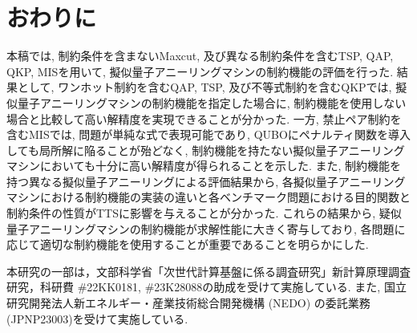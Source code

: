\documentclass[submit,techrep,noauthor]{ipsj}
\begin{document}
\section{おわりに}
本稿では, 制約条件を含まないMaxcut, 及び異なる制約条件を含むTSP, QAP, QKP, MISを用いて, 擬似量子アニーリングマシンの制約機能の評価を行った. 結果として, ワンホット制約を含むQAP, TSP, 及び不等式制約を含むQKPでは, 擬似量子アニーリングマシンの制約機能を指定した場合に, 制約機能を使用しない場合と比較して高い解精度を実現できることが分かった. 一方, 禁止ペア制約を含むMISでは, 問題が単純な式で表現可能であり, QUBOにペナルティ関数を導入しても局所解に陥ることが殆どなく, 制約機能を持たない擬似量子アニーリングマシンにおいても十分に高い解精度が得られることを示した. また, 制約機能を持つ異なる擬似量子アニーリングによる評価結果から, 各擬似量子アニーリングマシンにおける制約機能の実装の違いと各ベンチマーク問題における目的関数と制約条件の性質がTTSに影響を与えることが分かった. これらの結果から, 疑似量子アニーリングマシンの制約機能が求解性能に大きく寄与しており, 各問題に応じて適切な制約機能を使用することが重要であることを明らかにした.

\begin{acknowledgment}
本研究の一部は，文部科学省「次世代計算基盤に係る調査研究」新計算原理調査研究，科研費 \#22KK0181, \#23K28088の助成を受けて実施している. また, 国立研究開発法人新エネルギー・産業技術総合開発機構 (NEDO) の委託業務 (JPNP23003)を受けて実施している.
\end{acknowledgment}
\end{document}

